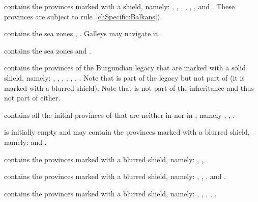 \begin{deflist}
\item[\anchorregion{Balkans}] contains the provinces marked with a
   shield, namely: ,
  , , ,
  , ,  and
  . These provinces are subject to
  rule~\ref{chSpecific:Balkans}).
\item[\anchorregion{Baltique}] contains the sea zones ,
  . Galleys may navigate it.
\item[\anchorregion{Noire}] contains the sea zones  and
  .
\item[\anchorregion{Belgique}] contains the provinces of the Burgundian legacy
  that are marked with a solid  shield, namely:
  , , ,
  , , ,
  . %
  Note that  is part of the legacy but not part of
  \regionBelgique (it is marked with a blurred shield). Note that
  \provinceLiege is not part of the inheritance and thus not part of
  \regionBelgique either.
\item[\anchorregion{Denmark}] contains all the initial provinces of
   that are neither in  nor in ,
  namely , , .
\item[\anchorregion{Duche de Kurland}] is initially empty and may contain the
  provinces marked with a blurred  shield, namely:
   and .
\item[\anchorregion{Duche de Prusse}] contains the provinces marked with a
  blurred  shield, namely: ,
  , .
\item[\anchorregion{Finlande}] contains the provinces marked with a blurred
   shield, namely: ,
  , ,  and
  .
\item[\anchorregion{Irlande}] contains the provinces marked with a blurred
   shield, namely: ,
  , , ,
  .

\end{deflist}
